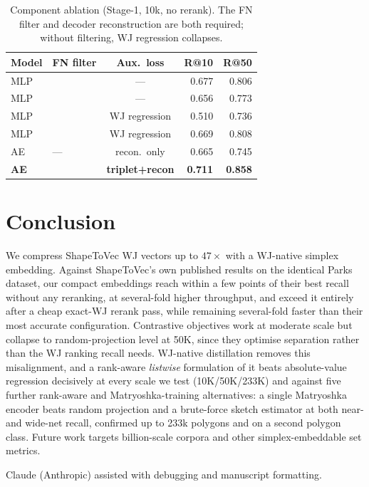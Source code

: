\documentclass[sigconf]{acmart}
\newcommand{\cmark}{\ding{51}}\newcommand{\xmark}{\ding{55}}
\begin{document}
\begin{table}[t]\centering
\caption{Component ablation (Stage-1, 10k, no rerank). The FN filter and decoder
reconstruction are both required; without filtering, WJ regression collapses.}
\label{tab:ablation}\small\setlength{\tabcolsep}{4pt}
\begin{tabular}{@{}llcrr@{}}
\toprule
Model & FN filter & Aux.\ loss & R@10 & R@50 \\
\midrule
MLP & \xmark & ---           & 0.677 & 0.806 \\
MLP & \cmark & ---           & 0.656 & 0.773 \\
MLP & \xmark & WJ regression & 0.510 & 0.736 \\
MLP & \cmark & WJ regression & 0.669 & 0.808 \\
AE  & ---    & recon.\ only  & 0.665 & 0.745 \\
\textbf{AE} & \cmark & \textbf{triplet+recon} & \textbf{0.711} & \textbf{0.858} \\
\bottomrule
\end{tabular}
\end{table}

\section{Conclusion}
We compress ShapeToVec WJ vectors up to $47\times$ with a WJ-native simplex embedding.
Against ShapeToVec's own published results on the identical Parks dataset, our
compact embeddings reach within a few points of their best recall without any
reranking, at several-fold higher throughput, and exceed it entirely after a cheap
exact-WJ rerank pass, while remaining several-fold faster than their most accurate
configuration. Contrastive objectives work at moderate scale but collapse to
random-projection level at 50K, since they optimise separation rather than the WJ
ranking recall needs. WJ-native distillation removes this misalignment, and a
rank-aware \emph{listwise} formulation of it beats absolute-value regression
decisively at every scale we test (10K/50K/233K) and against five further rank-aware
and Matryoshka-training alternatives: a single Matryoshka encoder beats random projection and a
brute-force sketch estimator at both near- and wide-net recall, confirmed up to 233k
polygons and on a second polygon class. Future work targets billion-scale corpora and
other simplex-embeddable set metrics.

\begin{acks}
Claude (Anthropic) assisted with debugging and manuscript formatting.
\end{acks}



\end{document}
